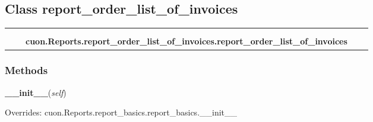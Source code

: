 \subsection{Class report\_order\_list\_of\_invoices}

    \label{cuon:Reports:report_order_list_of_invoices:report_order_list_of_invoices}
\begin{tabular}{cccccc}
\multicolumn{2}{r}{\settowidth{\BCL}{cuon.Reports.report\_basics.report\_basics}\multirow{2}{\BCL}{cuon.Reports.report\_basics.report\_basics}}
&&
  \\\cline{3-3}
  &&\multicolumn{1}{c|}{}
&&
  \\
&&\multicolumn{2}{l}{\textbf{cuon.Reports.report\_order\_list\_of\_invoices.report\_order\_list\_of\_invoices}}
\end{tabular}



  \subsubsection{Methods}

    \vspace{0.5ex}

\hspace{.8\funcindent}\begin{boxedminipage}{\funcwidth}

    \raggedright \textbf{\_\_init\_\_}(\textit{self})

\setlength{\parskip}{2ex}
\setlength{\parskip}{1ex}
      Overrides: cuon.Reports.report\_basics.report\_basics.\_\_init\_\_

    \end{boxedminipage}

    \label{cuon:Reports:report_order_list_of_invoices:report_order_list_of_invoices:getReportData}

    \vspace{0.5ex}

